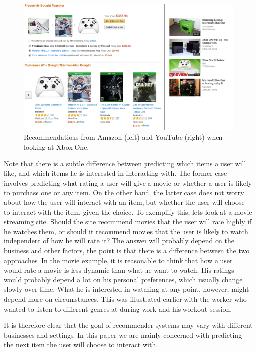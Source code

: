 \begin{figure}[htp]
	\centering
	\includegraphics[width=1.1\textwidth]{fig/recsys_example_xbox.png}
	\caption{Recommendations from Amazon (left) and YouTube (right) when looking at Xbox One.}
	\label{fig:recsys-example-xbox}
\end{figure}

Note that there is a subtle difference between predicting which items a user will like, and which items he is interested in interacting with. The former case involves predicting what rating a user will give a movie or whether a user is likely to purchase one or any item. On the other hand, the latter case does not worry about how the user will interact with an item, but whether the user will choose to interact with the item, given the choice. To exemplify this, lets look at a movie streaming site. Should the site recommend movies that the user will rate highly if he watches them, or should it recommend movies that the user is likely to watch independent of how he will rate it? The answer will probably depend on the business and other factors, the point is that there is a difference between the two approaches. In the movie example, it is reasonable to think that how a user would rate a movie is less dynamic than what he want to watch. His ratings would probably depend a lot on his personal preferences, which usually change slowly over time. What he is interested in watching at any point, however, might depend more on circumstances. This was illustrated earlier with the worker who wanted to listen to different genres at during work and his workout session.

It is therefore clear that the goal of recommender systems may vary with different businesses and settings. In this paper we are mainly concerned with predicting the next item the user will choose to interact with.

